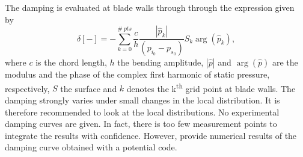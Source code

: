 The damping is evaluated at blade walls through through the
expression given by~\citet{Fransson1999}
\begin{equation}
    \delta [-] = - \sum^{\#~pts}_{k=0} \frac{c}{h} 
      \frac{|\widehat{p}_k|}{(p_{i_0} - p_{s_0})} S_k \arg (\widehat{p}_k),
\end{equation}
where $c$ is the chord length,
$h$ the bending amplitude, $| \widehat{p} |$ 
and $\arg (\widehat{p})$ are the modulus and the phase of the
complex first harmonic of static pressure, respectively, $S$ the surface
and $k$ denotes the k\textsuperscript{th}
grid point at blade walls.
The damping strongly varies under small changes in the
local distribution. It is therefore recommended to look at the local
distributions. No experimental damping curves are given. In fact,
there is too few measurement points to integrate the results with
confidence. However, \citet{Fransson1999}
provide numerical results of the damping curve obtained with a potential code.

